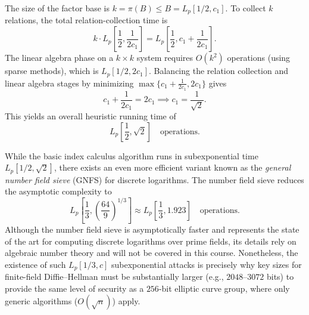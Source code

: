 The size of the factor base is \(k = \pi(B) \leq B = L_p[1/2, c_1]\).
To collect \(k\) relations, the total relation-collection time is
\[
    k \cdot L_p\left[\frac{1}{2}, \frac{1}{2c_1}\right] = L_p\left[\frac{1}{2}, c_1 + \frac{1}{2c_1}\right].
\]
The linear algebra phase on a \(k \times k\) system requires \(O(k^2)\) operations (using sparse methods), which is \(L_p[1/2, 2c_1]\).
Balancing the relation collection and linear algebra stages by minimizing \(\max\{c_1 + \frac{1}{2c_1}, 2c_1\}\) gives
\[
    c_1 + \frac{1}{2c_1} = 2c_1 \implies c_1 = \frac{1}{\sqrt{2}}.
\]
This yields an overall heuristic running time of
\[
    L_p\left[\frac{1}{2}, \sqrt{2}\right] \quad \text{operations.}
\]

\begin{remark}
    While the basic index calculus algorithm runs in subexponential time \(L_p[1/2, \sqrt{2}]\), there exists an even more efficient variant known as the \emph{general number field sieve} (GNFS) for discrete logarithms.
    The number field sieve reduces the asymptotic complexity to
    \[
        L_p\left[\frac{1}{3}, \left(\frac{64}{9}\right)^{1/3}\right] \approx L_p\left[\frac{1}{3}, 1.923\right] \quad \text{operations.}
    \]
    Although the number field sieve is asymptotically faster and represents the state of the art for computing discrete logarithms over prime fields, its details rely on algebraic number theory and will not be covered in this course.
    Nonetheless, the existence of such \(L_p[1/3, c]\) subexponential attacks is precisely why key sizes for finite-field Diffie--Hellman must be substantially larger (e.g., \(2048\)--\(3072\) bits) to provide the same level of security as a \(256\)-bit elliptic curve group, where only generic algorithms (\(O(\sqrt{n})\)) apply.
\end{remark}
